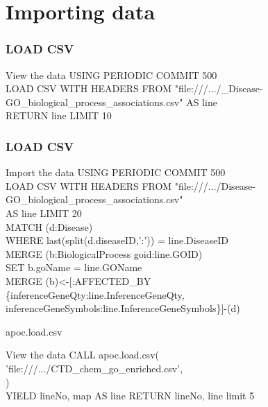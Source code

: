 \documentclass[12pt]{beamer}
\begin{document}
    \section{Importing data}
    \begin{frame}
        \frametitle{LOAD CSV}
        \begin{block}{View the data}
            USING PERIODIC COMMIT 500\\
            LOAD CSV WITH HEADERS FROM "file:///.../\_Disease-GO\_biological\_process\_associations.csv" AS line\\
            RETURN line LIMIT 10
        \end{block}
    \end{frame}
    
    \begin{frame}
        \frametitle{LOAD CSV}
        
        \begin{block}{Import the data}
            USING PERIODIC COMMIT 500\\
            LOAD CSV WITH HEADERS FROM "file:///.../Disease-GO\_biological\_process\_associations.csv"\\
            \hspace{1cm} AS line LIMIT 20\\
            MATCH (d:Disease)\\
            \hspace{1cm} WHERE last(split(d.diseaseID,':')) = line.DiseaseID\\ 
            MERGE (b:BiologicalProcess {goid:line.GOID})\\
            \hspace{1cm} SET b.goName = line.GOName\\
            MERGE (b)\textless-[:AFFECTED\_BY\\
            \hspace{2cm} \{inferenceGeneQty:line.InferenceGeneQty,\\
            \hspace{2cm} inferenceGeneSymbols:line.InferenceGeneSymbols\}]-(d)
        \end{block}
    \end{frame}

    \begin{frame}{apoc.load.csv}
        
        \begin{block}{View the data}
        CALL apoc.load.csv(\\
        \hspace{1cm}'file:///.../CTD\_chem\_go\_enriched.csv',\\
        {})\\
        YIELD lineNo, map AS line RETURN lineNo, line limit 5
        \end{block}
    \end{frame}
    
\end{document}
